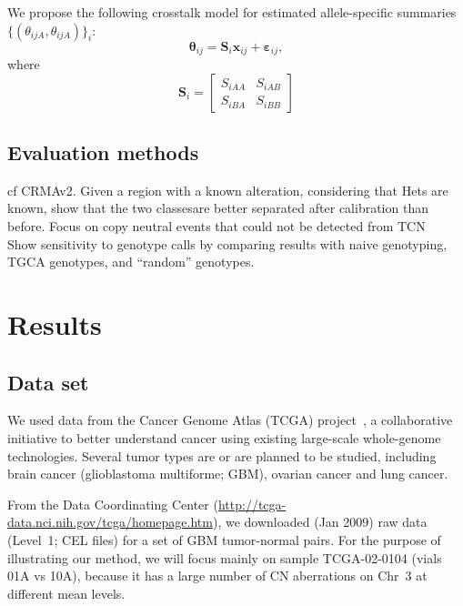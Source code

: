 \documentclass[10pt]{bmc_article}
\newenvironment{bmcformat}{\fussy\setboolean{publ}{true}}{\fussy}
\newcommand{\bx}{\mathbf{x}\xspace}
\newcommand{\bS}{\mathbf{S}\xspace}
\newcommand{\beps}{\bm{\varepsilon}\xspace}
\newcommand{\btheta}{\bm{\theta}\xspace}
\begin{document}
\begin{bmcformat}
We propose the following crosstalk model for estimated allele-specific summaries $\{(\theta_{ijA},\theta_{ijA})\}_i$:
\begin{equation}
  \btheta_{ij} = \bS_i \bx_{ij} + \beps_{ij},
  \label{eqnACCi}
\end{equation}
where 
\begin{equation}
 \bS_i = 
 \begin{bmatrix}
   S_{iAA} & S_{iAB} \\
   S_{iBA} & S_{iBB}
 \end{bmatrix}
  \label{eqnACCii}
\end{equation}


\subsection*{Evaluation methods}
\label{secEvaluation}
cf CRMAv2. Given a region with a known alteration, considering that Hets are known, show that the two classesare better separated after calibration than before. Focus on copy neutral events that could not be detected from TCN\\

Show sensitivity to genotype calls by comparing results with naive genotyping, TGCA genotypes, and ``random'' genotypes.

\section*{Results}
\label{secResults}

\subsection*{Data set}
We used data from the  Cancer Genome Atlas (TCGA) project~\cite{CollinsBarker_2007,TCGA_2008c}, a collaborative initiative to better understand cancer using existing large-scale whole-genome technologies.  Several tumor types are or are planned to be studied, including brain cancer (glioblastoma multiforme; GBM), ovarian cancer and lung cancer. 
 
From the Data Coordinating Center (\url{http://tcga-data.nci.nih.gov/tcga/homepage.htm}), we downloaded (Jan 2009) raw data (Level~1; CEL files) for a set of GBM tumor-normal pairs.
For the purpose of illustrating our method, we will focus mainly on sample TCGA-02-0104 (vials 01A vs 10A), because it has a large number of CN aberrations on Chr~3 at different mean levels.


\end{bmcformat}
\end{document}
